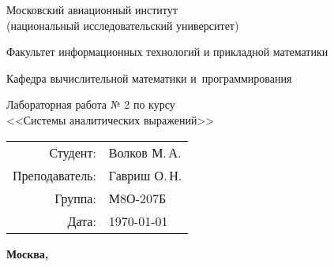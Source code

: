 \begin{titlepage}
\begin{center}
\bfseries

{\Large Московский авиационный институт\\ (национальный исследовательский университет)

}

\vspace{48pt}

{\large Факультет информационных технологий и прикладной математики
}

\vspace{36pt}

{\large Кафедра вычислительной математики и~программирования

}


\vspace{48pt}

Лабораторная работа № 2 по курсу \\
<<Системы аналитических выражений>>

\end{center}

\vspace{72pt}

\begin{flushright}
\begin{tabular}{rl}
Студент: & Волков М.\,А. \\
Преподаватель: & Гавриш О.\,Н. \\
Группа: & М8О-207Б \\
Дата: & \today
\end{tabular}
\end{flushright}

\vfill

\begin{center}
\bfseries
Москва, \the\year
\end{center}
\end{titlepage}

\pagebreak